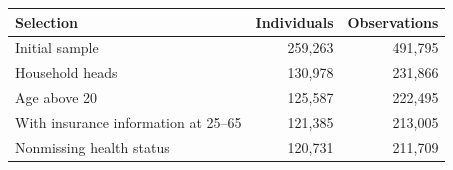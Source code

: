     \begin{tabular}{l r r} %
    \toprule
 \hline
Selection &  Individuals  & Observations\\ [0.5ex]
 \hline%
 Initial sample & 259,263 & 491,795\\
  Household heads & 130,978& 231,866\\
 Age above 20 & 125,587 &222,495\\
 With insurance information at 25--65 & 121,385&213,005\\
 Nonmissing health status &120,731&211,709\\[0.5ex] 
  \hline
 \bottomrule
    \end{tabular}
